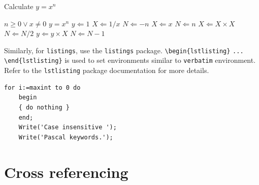 \documentclass[pdflatex,sn-mathphys]{sn-jnl}%
\theoremstyle{thmstyleone}%
\theoremstyle{thmstyletwo}%
\theoremstyle{thmstylethree}%
\begin{document}
\begin{algorithm}
  \caption{Calculate $y = x^n$}
  \label{alg:algo1}
  \begin{algorithmic}[1]
    \Require $n \geq 0 \vee x \neq 0$
    \Ensure $y = x^n$
    \State $y \Leftarrow 1$
    \label{algln2}
            \State $X \Leftarrow 1 / x$
            \State $N \Leftarrow -n$
    \Else
            \State $X \Leftarrow x$
            \State $N \Leftarrow n$
    \EndIf
                \State $X \Leftarrow X \times X$
                \State $N \Leftarrow N / 2$
            \Else[$N$ is odd]
                \State $y \Leftarrow y \times X$
                \State $N \Leftarrow N - 1$
            \EndIf
    \EndWhile
  \end{algorithmic}
  \end{algorithm}
\bigskip

Similarly, for \verb+listings+, use the \verb+listings+ package. \verb+\begin{lstlisting}+ \verb+...+ \verb+\end{lstlisting}+ is used to set environments similar to \verb+verbatim+ environment.
Refer to the \verb+lstlisting+ package documentation for more details.

\bigskip
\begin{minipage}{\hsize}%
  \lstset{frame=single,framexleftmargin=-1pt,framexrightmargin=-17pt,framesep=12pt,linewidth=0.98\textwidth,language=pascal}%
  \begin{lstlisting}[label={lst:lstlisting}]
    for i:=maxint to 0 do
    begin
    { do nothing }
    end;
    Write('Case insensitive ');
    Write('Pascal keywords.');
  \end{lstlisting}
\end{minipage}



\section{Cross referencing}
\label{sec:cross-referencing}
\end{document}
